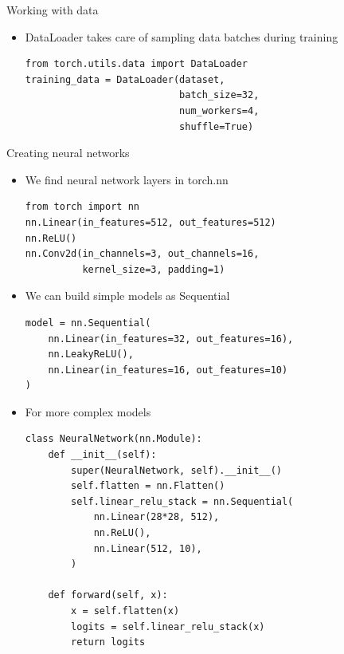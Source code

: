\documentclass[usenames,dvipsnames]{beamer}
\begin{document}
    \begin{frame}[fragile]{\secname}{\subsecname}
        Working with data
        \begin{itemize}
            \item DataLoader takes care of sampling data batches during training
            \begin{verbatim}
from torch.utils.data import DataLoader
training_data = DataLoader(dataset, 
                           batch_size=32, 
                           num_workers=4, 
                           shuffle=True)
            \end{verbatim}
        \end{itemize}
    \end{frame}
    \begin{frame}[fragile]{\secname}{\subsecname}
        Creating neural networks
        \begin{itemize}
            \item We find neural network layers in torch.nn
            \begin{verbatim}
from torch import nn
nn.Linear(in_features=512, out_features=512)
nn.ReLU()
nn.Conv2d(in_channels=3, out_channels=16, 
          kernel_size=3, padding=1)
            \end{verbatim}
            \item We can build simple models as Sequential
            \begin{verbatim}
model = nn.Sequential(
    nn.Linear(in_features=32, out_features=16),
    nn.LeakyReLU(),
    nn.Linear(in_features=16, out_features=10)
)
            \end{verbatim}
        \end{itemize}
    \end{frame}
    \begin{frame}[fragile]{\secname}{\subsecname}
        \begin{itemize}
            \item For more complex models
            \begin{verbatim}
class NeuralNetwork(nn.Module):
    def __init__(self):
        super(NeuralNetwork, self).__init__()
        self.flatten = nn.Flatten()
        self.linear_relu_stack = nn.Sequential(
            nn.Linear(28*28, 512),
            nn.ReLU(),
            nn.Linear(512, 10),
        )

    def forward(self, x):
        x = self.flatten(x)
        logits = self.linear_relu_stack(x)
        return logits
            \end{verbatim}
        \end{itemize}
    \end{frame}
    
\end{document}
